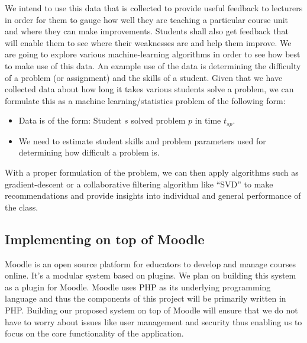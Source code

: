 \documentclass[12pt]{article}
\begin{document}
	We intend to use this data that is collected to provide useful feedback to lecturers in order for them to gauge how well they are teaching a particular course unit and where they can make improvements. Students shall also get feedback that will enable them to see where their weaknesses are and help	them improve. We are going to explore various machine-learning algorithms in order to see how best to make use of this data. An example use of the data is determining the difficulty of a problem (or assignment) and the skills of a student. Given that we have collected data about how long it takes various students solve a problem, we can formulate this as a machine learning/statistics problem of the following form:
	\begin{itemize}
		\item Data is of the form: Student $s$ solved problem $p$ in time $t_{sp}$.
		\item We need to estimate student skills and problem parameters used for determining how difficult a problem is. 
	\end{itemize}
	With a proper formulation of the problem, we can then apply algorithms such as gradient-descent \cite{gds} or a collaborative filtering algorithm like “SVD” \cite{kalman} to make recommendations and provide insights into individual and general performance of the class.
	\subsection{Implementing on top of Moodle}
	Moodle\cite{moodle} is an open source platform for educators to develop and manage courses online. It's a modular system based on plugins. We plan on building this system as a plugin for Moodle. Moodle uses PHP as its underlying programming language and thus the components of this project will be primarily written in PHP. Building our proposed system on top of Moodle will ensure that we do not have to worry about issues like user management and security thus enabling us to focus on the core functionality of the application.
\end{document}
